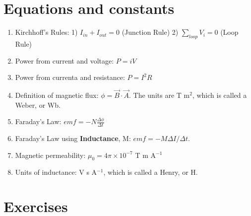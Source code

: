 \documentclass[10pt]{article}
\begin{document}
\maketitle

\section{Equations and constants}

\begin{enumerate}
\item Kirchhoff's Rules: 1) $I_{in} + I_{out} = 0$ (Junction Rule) 2) $\sum_{loop} V_i = 0$ (Loop Rule)
\item Power from current and voltage: $P = iV$
\item Power from currenta and resistance: $P = I^2 R$
\item Definition of magnetic flux: $\phi = \vec{B} \cdot \vec{A}$.  The units are T m$^2$, which is called a Weber, or Wb.
\item Faraday's Law: $emf = -N \frac{\Delta \phi}{\Delta t}$
\item Faraday's Law using \textbf{Inductance}, M: $emf = -M \Delta I / \Delta t$.
\item Magnetic permeability: $\mu_0 = 4\pi \times 10^{-7}$ T m A$^{-1}$
\item Units of inductance: V s A$^{-1}$, which is called a Henry, or H.
\end{enumerate}

\section{Exercises}
\end{document}
